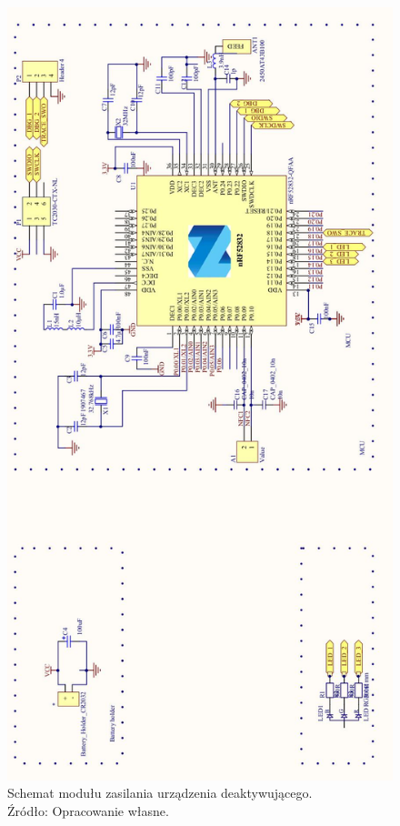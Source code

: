 \begin{figure}[H]
	\centering
	\includegraphics[width=12cm]{img/schematics/keytag.jpg}
	\caption{Schemat modułu zasilania urządzenia deaktywującego. \\ Źródło: Opracowanie własne.}
	\label{fig:image_keytag_schematic}
\end{figure}
